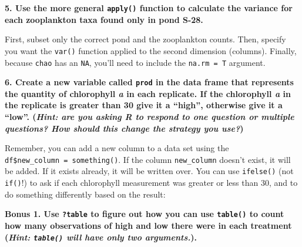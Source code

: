 \documentclass[]{book}
\newenvironment{Shaded}{\begin{snugshade}}{\end{snugshade}}
\newcommand{\KeywordTok}[1]{\textcolor[rgb]{0.13,0.29,0.53}{\textbf{#1}}}
\newcommand{\DataTypeTok}[1]{\textcolor[rgb]{0.13,0.29,0.53}{#1}}
\newcommand{\DecValTok}[1]{\textcolor[rgb]{0.00,0.00,0.81}{#1}}
\newcommand{\StringTok}[1]{\textcolor[rgb]{0.31,0.60,0.02}{#1}}
\newcommand{\OperatorTok}[1]{\textcolor[rgb]{0.81,0.36,0.00}{\textbf{#1}}}
\newcommand{\NormalTok}[1]{#1}
\theoremstyle{definition}
\theoremstyle{definition}
\theoremstyle{definition}
\theoremstyle{remark}
\begin{document}
\textbf{5. Use the more general \texttt{apply()} function to calculate
the variance for each zooplankton taxa found only in pond S-28.}

First, subset only the correct pond and the zooplankton counts. Then,
specify you want the \texttt{var()} function applied to the second
dimension (columns). Finally, because \texttt{chao} has an \texttt{NA},
you'll need to include the \texttt{na.rm\ =\ T} argument.

\begin{Shaded}
\end{Shaded}

\textbf{6. Create a new variable called \texttt{prod} in the data frame
that represents the quantity of chlorophyll \emph{a} in each replicate.
If the chlorophyll \emph{a} in the replicate is greater than 30 give it
a ``high'', otherwise give it a ``low''. (\emph{Hint: are you asking R
to respond to one question or multiple questions? How should this change
the strategy you use?})}

Remember, you can add a new column to a data set using the
\texttt{df\$new\_column\ =\ something()}. If the column
\texttt{new\_column} doesn't exist, it will be added. If it exists
already, it will be written over. You can use \texttt{ifelse()} (not
\texttt{if()}!) to ask if each chlorophyll measurement was greater or
less than 30, and to do something differently based on the result:

\begin{Shaded}
\end{Shaded}

\textbf{Bonus 1. Use \texttt{?table} to figure out how you can use
\texttt{table()} to count how many observations of high and low there
were in each treatment (\emph{Hint: \texttt{table()} will have only two
arguments.}).}
\end{document}
